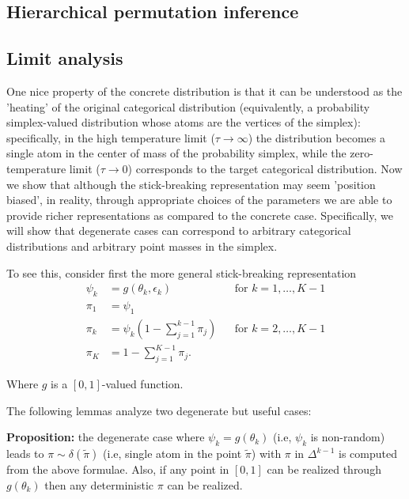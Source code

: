 \documentclass{article}
\begin{document}
\label{sub:vae}

\subsection{Hierarchical permutation inference}
\label{sub:synth_celegans}






\appendix
\subsection{Limit analysis}

One nice property of the concrete distribution \citep{maddison2016concrete, jang2016categorical} is that it can be understood as the 'heating' of the original categorical distribution (equivalently, a probability simplex-valued distribution whose atoms are the vertices of the simplex): specifically, in the high temperature limit ($\tau \rightarrow \infty$) the distribution becomes a single atom in the center of mass of the probability simplex, while the zero-temperature limit ($\tau\rightarrow 0$) corresponds to the target categorical distribution. Now we show that although the stick-breaking representation may seem 'position biased', in reality, through appropriate choices of the parameters we are able to provide richer representations as compared to the concrete case. Specifically, we will show that degenerate cases can correspond to arbitrary categorical distributions and arbitrary point masses in the simplex.

To see this, consider first the more general stick-breaking representation
\begin{align}
  \psi_k & = g(\theta_k,\epsilon_k)& &  \text{for } k=1, \ldots, K-1\\
  {\pi}_1 &= \psi_1 \\
  {\pi}_k &= \psi_k \left(1- \sum_{j=1}^{k-1} {\pi}_j\right) & &  \text{for } k=2, \ldots, K-1\\
{\pi}_K &= 1- \sum_{j=1}^{K-1} {\pi}_j.
\end{align}

Where $g$ is a $[0,1]$-valued function. 

The following lemmas analyze two degenerate but useful cases:

\textbf{Proposition:}  the degenerate case where $\psi_k=g(\theta_k)$ (i.e, $\psi_k$ is non-random) leads to $\pi\sim \delta(\tilde{\pi})$  (i.e, single atom in the point $\tilde{\pi}$) with $\pi$ in $\Delta^{k-1}$ is computed from the above formulae. Also, if any point in $[0,1]$ can be realized through $g(\theta_k)$ then any deterministic $\pi$ can be realized.
\end{document}
